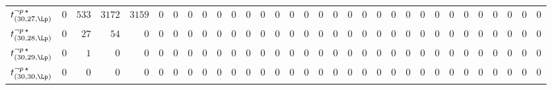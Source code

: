 \begin{tabular}{r|rrrrrrrrrrrrrrrrrrrrrrrrrrrrrrr}
  $t^{\neg p \, \star}_{(30,27,\Lp)}$ & $0$ & $533$ & $3172$ & $3159$ & $0$ & $0$ & $0$ & $0$ & $0$ & $0$ & $0$ & $0$ & $0$ & $0$ & $0$ & $0$ & $0$ & $0$ & $0$ & $0$ & $0$ & $0$ & $0$ & $0$ & $0$ & $0$ & $0$ & $0$ & $0$ & $0$ & $0$ \\
  $t^{\neg p \, \star}_{(30,28,\Lp)}$ & $0$ & $27$ & $54$ & $0$ & $0$ & $0$ & $0$ & $0$ & $0$ & $0$ & $0$ & $0$ & $0$ & $0$ & $0$ & $0$ & $0$ & $0$ & $0$ & $0$ & $0$ & $0$ & $0$ & $0$ & $0$ & $0$ & $0$ & $0$ & $0$ & $0$ & $0$ \\
  $t^{\neg p \, \star}_{(30,29,\Lp)}$ & $0$ & $1$ & $0$ & $0$ & $0$ & $0$ & $0$ & $0$ & $0$ & $0$ & $0$ & $0$ & $0$ & $0$ & $0$ & $0$ & $0$ & $0$ & $0$ & $0$ & $0$ & $0$ & $0$ & $0$ & $0$ & $0$ & $0$ & $0$ & $0$ & $0$ & $0$ \\
  $t^{\neg p \, \star}_{(30,30,\Lp)}$ & $0$ & $0$ & $0$ & $0$ & $0$ & $0$ & $0$ & $0$ & $0$ & $0$ & $0$ & $0$ & $0$ & $0$ & $0$ & $0$ & $0$ & $0$ & $0$ & $0$ & $0$ & $0$ & $0$ & $0$ & $0$ & $0$ & $0$ & $0$ & $0$ & $0$ & $0$ \\
\end{tabular}
